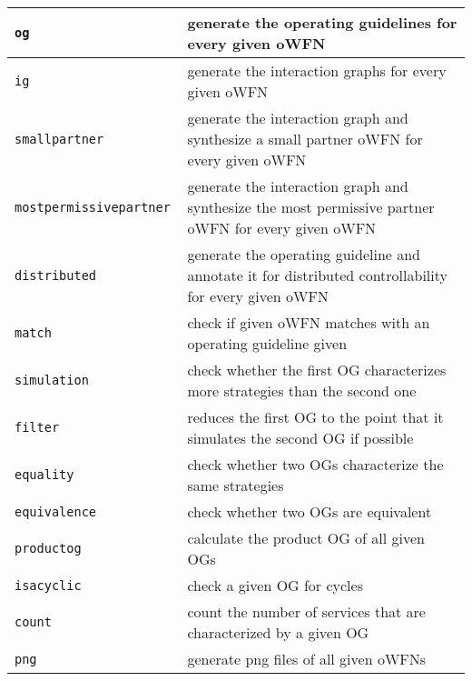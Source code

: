 
\begin{longtable}{lp{200pt}}
\hline
\texttt{og  }& generate the operating guidelines for every given oWFN \\
\hline
\texttt{ig  }& generate the interaction graphs for every given oWFN \\
\hline
\texttt{smallpartner }& generate the interaction graph and synthesize a small partner oWFN for every given oWFN \\
\hline
\texttt{mostpermissivepartner   }& generate the interaction graph and synthesize the most permissive partner oWFN for every given oWFN \\
\hline
\texttt{distributed }& generate the operating guideline and annotate it for distributed controllability for every given oWFN \\
\hline
\texttt{match   }& check if given oWFN matches with an operating guideline given \\
\hline
\texttt{simulation }& check whether the first OG characterizes more strategies than the second one \\
\hline
\texttt{filter }& reduces the first OG to the point that it simulates the second OG if possible \\
\hline
\texttt{equality }& check whether two OGs characterize the same strategies \\
\hline
\texttt{equivalence }& check whether two OGs are equivalent \\
\hline
\texttt{productog }& calculate the product OG of all given OGs \\
\hline
\texttt{isacyclic }& check a given OG for cycles \\
\hline
\texttt{count }& count the number of services that are characterized by a given OG \\
\hline
\texttt{png }& generate png files of all given oWFNs \\
\hline
\end{longtable}
